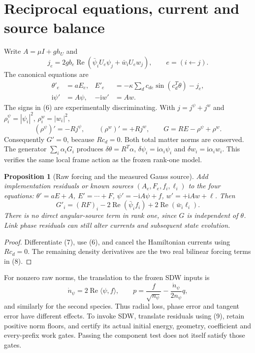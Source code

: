 \documentclass[10pt,a4paper]{article}
\newtheorem{proposition}[theorem]{Proposition}
\newcommand{\ii}{\mathrm i}
\newcommand{\Rea}{\operatorname{Re}}
\begin{document}
\newpage
\section{Reciprocal equations, current and source balance}
Write $A=\mu I+g h_U$ and
\[
j_e=2g b_e\Rea(\bar\psi_iU_e\psi_j+\bar w_iU_ew_j),\qquad e=(i\leftarrow j).
\]
The canonical equations are
\begin{equation}\begin{aligned}
\theta'_e&=aE_e,&E'_e&=-\kappa\sum_d c_{de}\sin(c_d^T\theta)-j_e,\\
\ii\psi'&=A\psi,&-\ii w'&=Aw.
\end{aligned}\tag{6}\end{equation}
The signs in (6) are experimentally discriminating. With $j=j^\psi+j^w$ and $\rho^\psi_i=|\psi_i|^2$, $\rho^w_i=|w_i|^2$,
\[
(\rho^\psi)'=-Rj^\psi,\qquad (\rho^w)'=+Rj^w,\qquad
G=RE-\rho^\psi+\rho^w.
\tag{7}
\]
Consequently $G'=0$, because $Rc_d=0$. Both total matter norms are conserved. The generator $\sum_i\alpha_iG_i$ produces $\delta\theta=R^T\alpha$, $\delta\psi_i=\ii\alpha_i\psi_i$ and $\delta w_i=\ii\alpha_iw_i$. This verifies the same local frame action as the frozen rank-one model.

\begin{proposition}[Raw forcing and the measured Gauss source]
Add implementation residuals or known sources $(A_e,F_e,f_i,\ell_i)$ to the four equations: $\theta'=aE+A$, $E'=\cdots+F$, $\psi'=-\ii A\psi+f$, $w'=+\ii Aw+\ell$. Then
\[
G'_i=(RF)_i-2\Rea(\bar\psi_i f_i)+2\Rea(\bar w_i\ell_i).
\tag{8}
\]
There is no direct angular-source term in rank one, since $G$ is independent of $\theta$. Link phase residuals can still alter currents and subsequent state evolution.
\end{proposition}
\begin{proof}
Differentiate (7), use (6), and cancel the Hamiltonian currents using $Rc_d=0$. The remaining density derivatives are the two real bilinear forcing terms in (8).
\end{proof}
For nonzero raw norms, the translation to the frozen SDW inputs is
\[
\dot n_\psi=2\Rea\langle\psi,f\rangle,\qquad
p=\frac f{\sqrt{n_\psi}}-\frac{\dot n_\psi}{2n_\psi}q,
\tag{9}
\]
and similarly for the second species. Thus radial loss, phase error and tangent error have different effects. To invoke SDW, translate residuals using (9), retain positive norm floors, and certify its actual initial energy, geometry, coefficient and every-prefix work gates. Passing the component test does not itself satisfy those gates.
\end{document}

